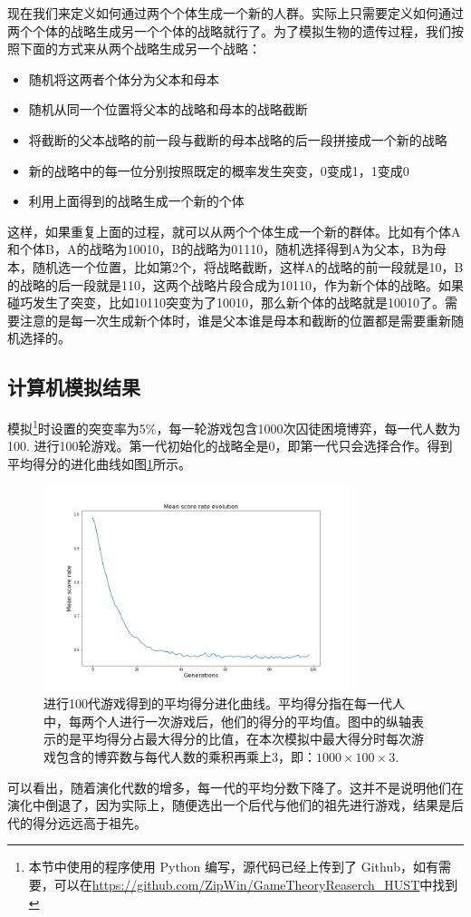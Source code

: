 \documentclass[lang=cn,11pt]{elegantpaper}
\begin{document}
现在我们来定义如何通过两个个体生成一个新的人群。实际上只需要定义如何通过两个个体的战略生成另一个个体的战略就行了。为了模拟生物的遗传过程，我们按照下面的方式来从两个战略生成另一个战略：
\begin{itemize}
	\item 随机将这两者个体分为父本和母本
	\item 随机从同一个位置将父本的战略和母本的战略截断
	\item 将截断的父本战略的前一段与截断的母本战略的后一段拼接成一个新的战略
	\item 新的战略中的每一位分别按照既定的概率发生突变，0变成1，1变成0
	\item 利用上面得到的战略生成一个新的个体
\end{itemize}
这样，如果重复上面的过程，就可以从两个个体生成一个新的群体。比如有个体A和个体B，A的战略为10010，B的战略为01110，随机选择得到A为父本，B为母本，随机选一个位置，比如第2个，将战略截断，这样A的战略的前一段就是10，B的战略的后一段就是110，这两个战略片段合成为10110，作为新个体的战略。如果碰巧发生了突变，比如10110突变为了10010，那么新个体的战略就是10010了。需要注意的是每一次生成新个体时，谁是父本谁是母本和截断的位置都是需要重新随机选择的。
\subsection{计算机模拟结果}
模拟\footnote{本节中使用的程序使用 Python 编写，源代码已经上传到了 Github，如有需要，可以在\url{https://github.com/ZipWin/GameTheoryReaserch\_HUST}中找到}时设置的突变率为5\%，每一轮游戏包含1000次囚徒困境博弈，每一代人数为100. 进行100轮游戏。第一代初始化的战略全是0，即第一代只会选择合作。得到平均得分的进化曲线如图\ref{fig:scores}所示。
\begin{figure}[!htb]
	\centering
	\includegraphics[width=0.8\textwidth]{figure/scores.png}
	\caption{进行100代游戏得到的平均得分进化曲线。平均得分指在每一代人中，每两个人进行一次游戏后，他们的得分的平均值。图中的纵轴表示的是平均得分占最大得分的比值，在本次模拟中最大得分时每次游戏包含的博弈数与每代人数的乘积再乘上3，即：$1000\times100\times3$. \label{fig:scores}}
\end{figure}
可以看出，随着演化代数的增多，每一代的平均分数下降了。这并不是说明他们在演化中倒退了，因为实际上，随便选出一个后代与他们的祖先进行游戏，结果是后代的得分远远高于祖先。
\end{document}
